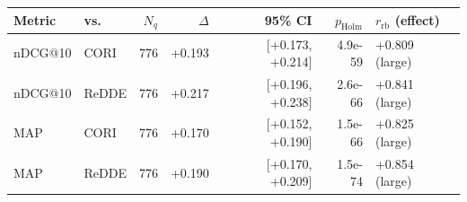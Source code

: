 \begin{tabular}{llrrrrl}
\toprule
Metric & vs.\ & $N_q$ & $\Delta$ & 95\% CI & $p_{\text{Holm}}$ & $r_{\mathrm{rb}}$ (effect) \\
\midrule
nDCG@10 & CORI & 776 & +0.193 & [+0.173, +0.214] & 4.9e-59 & +0.809 (large) \\
nDCG@10 & ReDDE & 776 & +0.217 & [+0.196, +0.238] & 2.6e-66 & +0.841 (large) \\
MAP & CORI & 776 & +0.170 & [+0.152, +0.190] & 1.5e-66 & +0.825 (large) \\
MAP & ReDDE & 776 & +0.190 & [+0.170, +0.209] & 1.5e-74 & +0.854 (large) \\
\bottomrule
\end{tabular}
